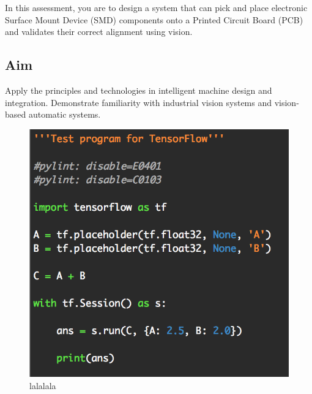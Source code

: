 \documentclass[a4paper, 10pt]{IEEEconf}
\begin{document}
In this assessment, you are to design a system that can pick and place electronic Surface Mount Device (SMD) components onto a Printed Circuit Board (PCB) and validates their correct alignment using vision.

%



\subsection{Aim}

Apply the principles and technologies in intelligent machine design and integration.
Demonstrate familiarity with industrial vision systems and vision-based automatic systems.


\begin{figure}[H]
  \includegraphics[width=0.5\linewidth,center]{images/test}
  \caption{lalalala}
  \label{fig:lalalala}
\end{figure}

\end{document}

